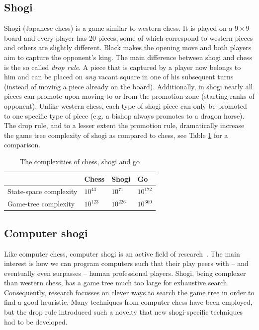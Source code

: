 \documentclass[a4paper, 11pt]{article}
\begin{document}
\subsection{Shogi}
Shogi (Japanese chess\cite{shogibook}) is a game similar to western chess. It is played on a $9 \times 9$ board and every
player has 20 pieces, some of which correspond to western pieces and others are slightly different.
Black makes the opening move and both players aim to capture the opponent's king.
The main difference between shogi and chess is the so called \emph{drop rule}.
A piece that is captured by a player now belongs to him and can be placed on \textit{any} vacant square in one of his subsequent turns
(instead of moving a piece already on the board).
Additionally, in shogi nearly all pieces can promote upon moving to or from the promotion zone (starting ranks of opponent).
Unlike western chess, each type of shogi piece can only be promoted to one specific type of piece (e.g. a bishop always promotes to a dragon horse).
The drop rule, and to a lesser extent the promotion rule, dramatically increase the game tree complexity of shogi as compared to chess, see Table
\ref{table:complex} for a comparison.\\
\begin{table}
\center
\def\arraystretch{1.5}
\begin{tabular}{l l l l}
 & Chess & Shogi & Go \\\hline
State-space complexity & $10^{43}$ & $10^{71}$ & $10^{172}$ \\
Game-tree complexity & $10^{123}$ & $10^{226}$ & $10^{360}$ \\
\hline
\end{tabular}
\caption{The complexities of chess, shogi and go}
\label{table:complex}
\end{table}

\subsection{Computer shogi}
Like computer chess, computer shogi is an active field of research~\cite{iida2002computer}. The main interest is how we can program computers 
such that their play peers with -- and eventually even surpasses -- human professional players. Shogi, being complexer
than western chess, has a game tree much too large for exhaustive search. Consequently, research
focusses on clever ways to search the game tree in order to find a good heuristic. Many techniques from computer chess
have been employed, but the drop rule introduced such a novelty that new shogi-specific techniques had to be developed.\\
\end{document}
